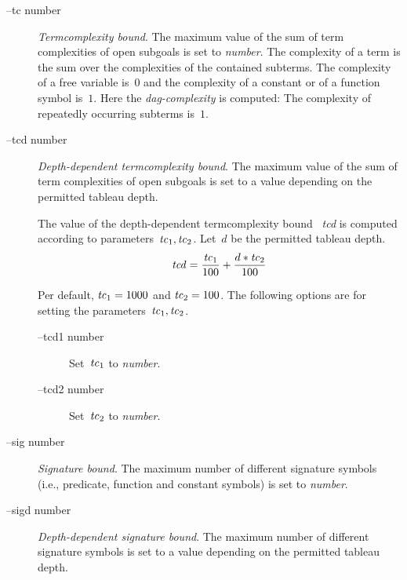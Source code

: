\begin{description}
\begin{description}
           \end{description}
      \item[--tc number]
           {\em Termcomplexity bound\/}. The maximum value of the sum
           of  term  complexities  of open  subgoals  is set to {\it
           number\/}. The complexity of a term is the sum over the
           complexities of the  contained subterms.  The  complexity
           of a free variable is~$0$ and the complexity of a constant
           or of a function symbol is~$1$.  Here the {\it
           dag-complexity\/}  is computed: The complexity of
           repeatedly occurring subterms is~$1$. 
      \item[--tcd number]
           {\em Depth-dependent termcomplexity bound\/}. 
           The maximum value of the sum of term complexities of open
           subgoals is set to a value depending on the permitted
           tableau depth. 

           The value of the depth-dependent termcomplexity bound~{\it
           tcd\/} is computed according to parameters~$\mbox{{\it
           tc\/}}_1, \mbox{{\it tc\/}}_2$.  Let~$d$ be the permitted
           tableau depth. 
           \[
               \mbox{{\it tcd\/}} = 
               \frac{\mbox{{\it tc\/}}_1}
                    {100} +
               \frac{d * \mbox{{\it tc\/}}_2}
                    {100}
           \] 
           
           Per default, $\mbox{{\it tc\/}}_1 = 1000$ and 
           $\mbox{{\it tc\/}}_2 = 100$.
           The following options are for setting the
           parameters~$\mbox{{\it tc\/}}_1, \mbox{{\it tc\/}}_2$.   
           \begin{description}
           \item [--tcd1 number] 
                 Set~$\mbox{{\it tc\/}}_1$ to {\it number\/}. 
           \item [--tcd2 number] 
                 Set~$\mbox{{\it tc\/}}_2$ to {\it number\/}. 
           \end{description}
      \item[--sig number]
           {\em Signature bound\/}. The maximum number of different
           signature symbols (i.e., predicate, function and constant
           symbols) is set to {\it number\/}.
      \item[--sigd number]
           {\em Depth-dependent signature bound\/}. 
           The maximum number of different signature symbols is set to
           a value depending on the permitted tableau depth. 


\end{description}
